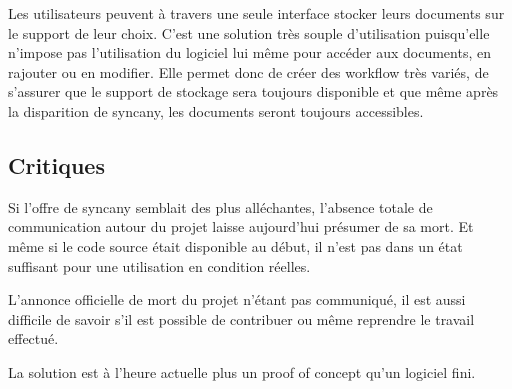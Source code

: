 \vspace{1cm}

Les utilisateurs peuvent à travers une seule interface stocker leurs documents sur le support de leur choix. C'est une solution très souple d'utilisation puisqu'elle n'impose pas l'utilisation du logiciel lui même pour accéder aux documents, en rajouter ou en modifier. Elle permet donc de créer des workflow très variés, de s'assurer que le support de stockage sera toujours disponible et que même après la disparition de syncany, les documents seront toujours accessibles.

\subsection{Critiques}
Si l'offre de syncany semblait des plus alléchantes, l'absence totale de communication autour du projet laisse aujourd'hui présumer de sa mort. Et même si le code source était disponible au début, il n'est pas dans un état suffisant pour une utilisation en condition réelles.

L'annonce officielle de mort du projet n'étant pas communiqué, il est aussi difficile de savoir s'il est possible de contribuer ou même reprendre le travail effectué.

La solution est à l'heure actuelle plus un proof of concept qu'un logiciel fini.
